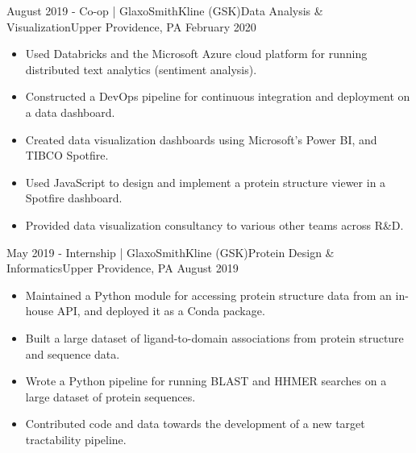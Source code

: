 \begin{experiences}
  \experience
    {August 2019 -} {Co-op | GlaxoSmithKline (GSK)}{Data Analysis \& Visualization}{Upper Providence, PA}
    {February 2020} {
    \begin{itemize}
    \item Used Databricks and the Microsoft Azure cloud platform for running distributed text analytics (sentiment analysis).
    \item Constructed a DevOps pipeline for continuous integration and deployment on a data dashboard.
    \item Created data visualization dashboards using Microsoft's Power BI, and TIBCO Spotfire.
    \item Used JavaScript to design and implement a protein structure viewer in a Spotfire dashboard.
    \item Provided data visualization consultancy to various other teams across R\&D.
    \end{itemize}
    }

  \emptySeparator

  \experience
    {May 2019 -} {Internship | GlaxoSmithKline (GSK)}{Protein Design \& Informatics}{Upper Providence, PA}
    {August 2019}    {
        \begin{itemize}
        \item Maintained a Python module for accessing protein structure data from an in-house API, and deployed it as a Conda package.
        \item Built a large dataset of ligand-to-domain associations from protein structure and sequence data.
        \item Wrote a Python pipeline for running BLAST and HHMER searches on a large dataset of protein sequences.
        \item Contributed code and data towards the development of a new target tractability pipeline.
        \end{itemize}
    }

  \emptySeparator


\end{experiences}

